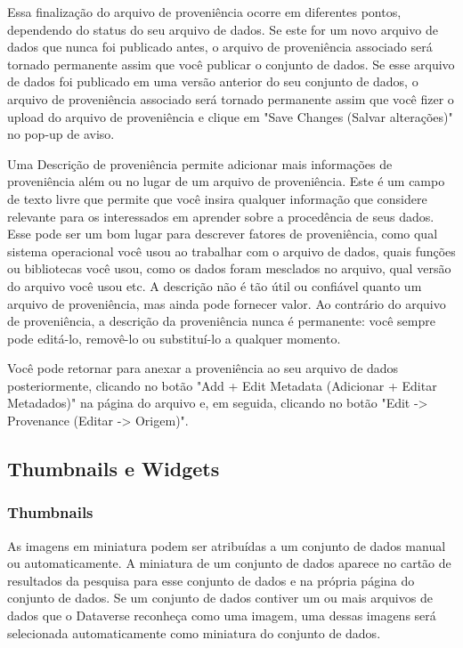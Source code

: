 \documentclass[12pt,hidelinks]{article}
\begin{document}
Essa finalização do arquivo de proveniência ocorre em diferentes pontos, dependendo do status do seu arquivo de dados. Se este for um novo arquivo de dados que nunca foi publicado antes, o arquivo de proveniência associado será tornado permanente assim que você publicar o conjunto de dados. Se esse arquivo de dados foi publicado em uma versão anterior do seu conjunto de dados, o arquivo de proveniência associado será tornado permanente assim que você fizer o upload do arquivo de proveniência e clique em "Save Changes (Salvar alterações)" no pop-up de aviso.

Uma Descrição de proveniência permite adicionar mais informações de proveniência além ou no lugar de um arquivo de proveniência. Este é um campo de texto livre que permite que você insira qualquer informação que considere relevante para os interessados em aprender sobre a procedência de seus dados. Esse pode ser um bom lugar para descrever fatores de proveniência, como qual sistema operacional você usou ao trabalhar com o arquivo de dados, quais funções ou bibliotecas você usou, como os dados foram mesclados no arquivo, qual versão do arquivo você usou etc. A descrição não é tão útil ou confiável quanto um arquivo de proveniência, mas ainda pode fornecer valor. Ao contrário do arquivo de proveniência, a descrição da proveniência nunca é permanente: você sempre pode editá-lo, removê-lo ou substituí-lo a qualquer momento.

Você pode retornar para anexar a proveniência ao seu arquivo de dados posteriormente, clicando no botão "Add + Edit Metadata (Adicionar + Editar Metadados)" na página do arquivo e, em seguida, clicando no botão "Edit -> Provenance (Editar -> Origem)".
    
    \subsection{Thumbnails e Widgets}
    
        \subsubsection{Thumbnails}
        
\qquad As imagens em miniatura podem ser atribuídas a um conjunto de dados manual ou automaticamente. A miniatura de um conjunto de dados aparece no cartão de resultados da pesquisa para esse conjunto de dados e na própria página do conjunto de dados. Se um conjunto de dados contiver um ou mais arquivos de dados que o Dataverse reconheça como uma imagem, uma dessas imagens será selecionada automaticamente como miniatura do conjunto de dados.
\end{document}
